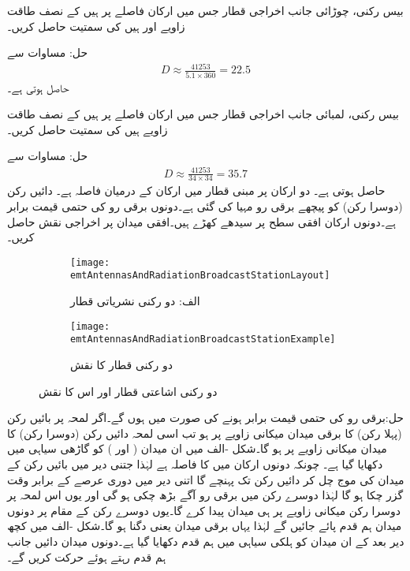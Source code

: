 بیس رکنی، چوڑائی جانب اخراجی قطار جس میں ارکان  فاصلے پر ہیں کے نصف طاقت زاویے  اور  ہیں کی سمتیت حاصل کریں۔

حل: مساوات  سے 
\begin{align*}
D \approx \frac{\num{41253}}{5.1 \times 360}=22.5
\end{align*}
حاصل ہوتی ہے۔


بیس رکنی، لمبائی جانب اخراجی قطار جس میں ارکان  فاصلے پر ہیں کے نصف طاقت زاویے  ہیں کی سمتیت حاصل کریں۔

حل: مساوات  سے 
\begin{align*}
D \approx \frac{\num{41253}}{34 \times 34}=35.7
\end{align*}
حاصل ہوتی ہے۔
دو ارکان پر مبنی قطار میں ارکان کے درمیان فاصلہ  ہے۔ دائیں رکن (دوسرا رکن) کو  پیچھے برقی رو مہیا کی گئی ہے۔دونوں برقی رو کی حتمی قیمت برابر ہے۔دونوں ارکان افقی سطح پر سیدھے کھڑے ہیں۔افقی میدان پر اخراجی نقش حاصل کریں۔
   
\begin{figure}
\centering
\begin{subfigure}{0.4\textwidth}
\centering
\texttt{[image: emtAntennasAndRadiationBroadcastStationLayout]}
\caption*{الف: دو رکنی نشریاتی قطار}
\end{subfigure}%
%
\begin{subfigure}{0.4\textwidth}
\centering
\texttt{[image: emtAntennasAndRadiationBroadcastStationExample]}
\caption*{دو رکنی قطار کا نقش}
\end{subfigure}%
\caption{دو رکنی اشاعتی قطار اور اس کا نقش}
\label{شکل_اینٹینا_اشاعتی_قطار}
\end{figure}

حل:برقی رو کی حتمی قیمت برابر ہونے کی صورت میں  ہوں گے۔اگر لمحہ  پر بائیں رکن (پہلا رکن) کا برقی میدان  میکانی زاویے پر ہو تب اسی لمحہ دائیں رکن (دوسرا رکن) کا میدان  میکانی زاویے پر ہو گا۔شکل -الف میں ان میدان ( اور ) کو گاڑھی سیاہی میں دکھایا گیا ہے۔ چونکہ دونوں ارکان میں  کا فاصلہ ہے لہٰذا جتنی دیر میں بائیں رکن کے میدان کی موج  چل کر دائیں رکن تک پہنچے گا اتنی دیر میں دوری عرصے کے  برابر وقت گزر چکا ہو گا لہٰذا دوسرے رکن میں برقی رو  آگے بڑھ چکی ہو گی اور یوں اس لمحہ پر دوسرا رکن  میکانی زاویے پر ہی میدان پیدا کرے گا۔یوں دوسرے رکن کے مقام پر دونوں میدان ہم قدم پائے جائیں گے لہٰذا یہاں برقی میدان  یعنی دگنا ہو گا۔شکل -الف میں کچھ دیر بعد کے ان میدان کو ہلکی سیاہی میں ہم قدم دکھایا گیا ہے۔دونوں میدان دائیں جانب ہم قدم رہتے ہوئے حرکت کریں گے۔

